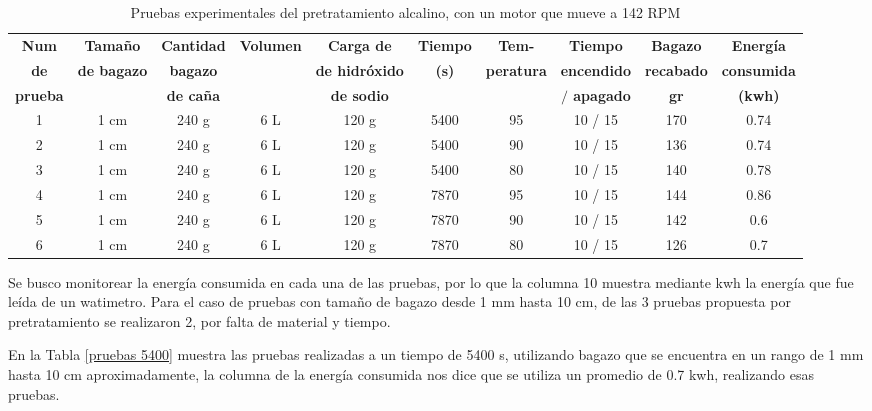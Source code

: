 \documentclass[12pt]{article}
\begin{document}
	\begin{table}[H]
		\centering
		\caption{Pruebas experimentales del pretratamiento alcalino, con un motor que mueve a 142 RPM}
		\label{pruebas alcalino 1 cm}
		\resizebox{16cm}{!} {
			\begin{tabular}{|c|c|c|c|c|c|c|c|c|c|  }
	 			\hline
\textbf{Num} & \textbf{Tamaño } & \textbf{Cantidad } & \textbf{Volumen} & \textbf{Carga de} & \textbf{Tiempo} & \textbf{Tem-} & \textbf{Tiempo} & \textbf{Bagazo} & \textbf{Energía} \\
\textbf{de}& \textbf{ de bagazo} & \textbf{ bagazo} & & \textbf{de hidróxido} & \textbf{(s)} & \textbf{peratura}&  \textbf{ encendido}& \textbf{recabado} &\textbf{consumida}  \\

\textbf{prueba}	& &  \textbf{ de caña} & &\textbf{de sodio}  &  &  &\textbf{$/$ apagado} &\textbf{gr} & \textbf{(kwh)}\\


				\hline
				1 & 1 cm & 240 g & 6 L & 120 g & 5400 & 95 & 10 / 15 & 170  & 0.74\\ \hline
				
				2 & 1 cm & 240 g & 6 L & 120 g & 5400 & 90 & 10 / 15 &  136 & 0.74\\\hline
				
				3 & 1 cm & 240 g & 6 L & 120 g & 5400 & 80 & 10 / 15 &  140 & 0.78\\\hline
				
				4 & 1 cm & 240 g & 6 L & 120 g & 7870 & 95 & 10 / 15 &  144 & 0.86\\\hline
			
				5 & 1 cm & 240 g & 6 L & 120 g & 7870 & 90 & 10 / 15 &  142 & 0.6 \\  \hline
			
				6 & 1 cm & 240 g & 6 L & 120 g & 7870 & 80 & 10 / 15  & 126 & 0.7 \\  \hline
		
				\hline
			\end{tabular}
		}

	\end{table}
	Se busco monitorear la energía consumida en cada una de las pruebas, por lo que la columna 10 muestra mediante kwh la energía que fue leída de un watimetro.
	Para el caso de pruebas con tamaño de bagazo desde 1 mm hasta 10 cm, de las 3 pruebas propuesta por pretratamiento se realizaron 2, por falta de material y tiempo. 	
	
	En la Tabla \ref{pruebas 5400} muestra las pruebas realizadas a un tiempo de 5400 s, utilizando bagazo que se encuentra en un rango de 1 mm hasta 10 cm aproximadamente, la columna de la energía consumida nos dice que se utiliza un promedio de 0.7 kwh, realizando esas pruebas.
	
\end{document}
